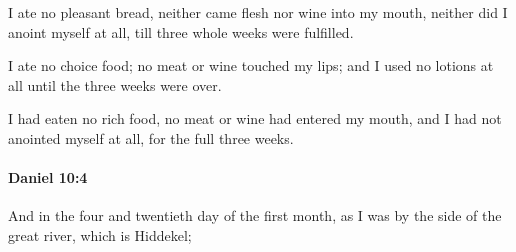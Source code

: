 			\begin{versebox}
					\item[BHS] 
					\item[LXX] 
					\item[ASV] I ate no pleasant bread, neither came flesh nor wine into my mouth, neither did I anoint myself at all, till three whole weeks were fulfilled.
					\item[NIV] I ate no choice food; no meat or wine touched my lips; and I used no lotions at all until the three weeks were over.
					\item[NRSV] I had eaten no rich food, no meat or wine had entered my mouth, and I had not anointed myself at all, for the full three weeks.
			\end{versebox}

		\paragraph{Daniel 10:4} %
			\label{DANIEL-10-4}

			And in the four and twentieth day of the first month, as I was by the side of the great river, which is Hiddekel;

